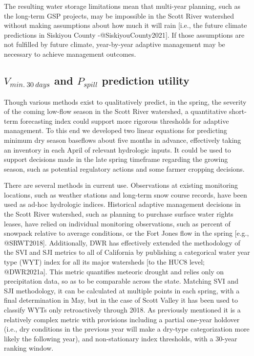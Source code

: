 \documentclass[
]{article}
\begin{document}
The resulting water storage limitations mean that multi-year planning,
such as the long-term GSP projects, may be impossible in the Scott River
watershed without making assumptions about how much it will rain
{[}i.e., the future climate predictions in Siskiyou County
-@SiskiyouCounty2021{]}. If those assumptions are not fulfilled by
future climate, year-by-year adaptive management may be necessary to
achieve management outcomes.

\hypertarget{v_min.30days-and-p_spill-prediction-utility}{%
\subsection{\texorpdfstring{\(V_{min.~30~days}\) and \(P_{spill}\)
prediction
utility}{V\_\{min.\textasciitilde30\textasciitilde days\} and P\_\{spill\} prediction utility}}\label{v_min.30days-and-p_spill-prediction-utility}}

Though various methods exist to qualitatively predict, in the spring,
the severity of the coming low-flow season in the Scott River watershed,
a quantitative short-term forecasting index could support more rigorous
thresholds for adaptive management. To this end we developed two linear
equations for predicting minimum dry season baseflows about five months
in advance, effectively taking an inventory in each April of relevant
hydrologic inputs. It could be used to support decisions made in the
late spring timeframe regarding the growing season, such as potential
regulatory actions and some farmer cropping decisions.

There are several methods in current use. Observations at existing
monitoring locations, such as weather stations and long-term snow course
records, have been used as ad-hoc hydrologic indices. Historical
adaptive management decisions in the Scott River watershed, such as
planning to purchase surface water rights leases, have relied on
individual monitoring observations, such as percent of snowpack relative
to average conditions, or the Fort Jones flow in the spring {[}e.g.,
@SRWT2018{]}. Additionally, DWR has effectively extended the methodology
of the SVI and SJI metrics to all of California by publishing a
categorical water year type (WYT) index for all its major watersheds
{[}to the HUC8 level; @DWR2021a{]}. This metric quantifies meteoric
drought and relies only on precipitation data, so as to be comparable
across the state. Matching SVI and SJI methodology, it can be calculated
at multiple points in each spring, with a final determination in May,
but in the case of Scott Valley it has been used to classify WYTs only
retroactively through 2018. As previously mentioned it is a relatively
complex metric with provisions including a partial one-year holdover
(i.e., dry conditions in the previous year will make a dry-type
categorization more likely the following year), and non-stationary index
thresholds, with a 30-year ranking window.
\end{document}
